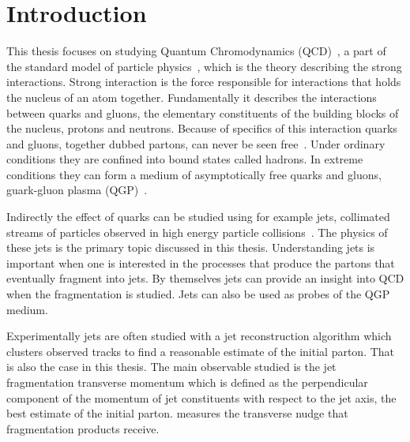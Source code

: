 

\begin{abstract}

\end{abstract}
\tableofcontents

\clearpage
\section{Introduction}
\label{sec:introduction}
This thesis focuses on studying Quantum Chromodynamics (QCD)~\cite{gross1973asymptotically}, a part of the standard model of particle physics~\cite{Tanabashi:2018oca}, which is the theory describing the strong interactions. Strong interaction is the force responsible for interactions that holds the nucleus of an atom together. Fundamentally it describes the interactions between quarks and gluons, the elementary constituents of the building blocks of the nucleus, protons and neutrons. Because of specifics of this interaction quarks and gluons, together dubbed partons, can never be seen free~\cite{Perl:2004qc}. Under ordinary conditions they are confined into bound states called hadrons. In extreme conditions they can form a medium of asymptotically free quarks and gluons, guark-gluon plasma (QGP)~\cite{Shuryak:1980}. %

Indirectly the effect of quarks can be studied using for example jets, collimated streams of particles observed in high energy particle collisions~\cite{Perkins:1982xb}. The physics of these jets is the primary topic discussed in this thesis. Understanding jets is important when one is interested in the processes that produce the partons that eventually fragment into jets. By themselves jets can provide an insight into QCD when the fragmentation is studied. Jets can also be used as probes of the QGP medium. 

Experimentally jets are often studied with a jet reconstruction algorithm which clusters observed tracks to find a reasonable estimate of the initial parton. That is also the case in this thesis. The main observable studied is the jet fragmentation transverse momentum \jt{} which is defined as the perpendicular component of the momentum of jet constituents with respect to the jet axis, the best estimate of the initial parton. \jt{} measures the transverse nudge that fragmentation products receive.

